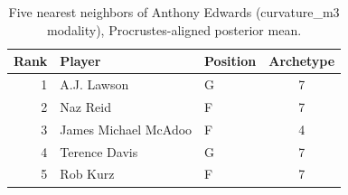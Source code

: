 \begin{table}[htbp]
  \centering\small
  \begin{tabular}{rllc}
    \toprule
    Rank & Player & Position & Archetype \\
    \midrule
    1 & A.J. Lawson & G & 7 \\
    2 & Naz Reid & F & 7 \\
    3 & James Michael McAdoo & F & 4 \\
    4 & Terence Davis & G & 7 \\
    5 & Rob Kurz & F & 7 \\
    \bottomrule
  \end{tabular}
  \caption{Five nearest neighbors of Anthony Edwards (curvature_m3 modality), Procrustes-aligned posterior mean.}
  \label{tab:Anthony_Edwards_neighbors_curvature_m3}
\end{table}

